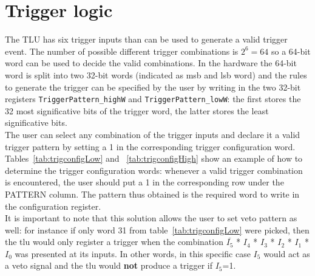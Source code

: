 \section{Trigger logic}\label{ch:triggerLogic}
The TLU has six trigger inputs than can be used to generate a valid trigger event. The number of possible different trigger combinations is $2^6= 64$ so a 64-bit word can be used to decide the valid combinations. In the hardware the 64-bit word is split into two 32-bit words (indicated as \gls{msb} and \gls{lsb} word) and the rules to generate the trigger can be specified by the user by writing in the two 32-bit registers \verb|TriggerPattern_highW| and \verb|TriggerPattern_lowW|: the first stores the 32 most significative bits of the trigger word, the latter stores the least significative bits.\\
The user can select any combination of the trigger inputs and declare it a valid trigger pattern by setting a 1 in the corresponding trigger configuration word.
Tables~\ref{tab:trigconfigLow} and ~\ref{tab:trigconfigHigh} show an example of how to determine the trigger configuration words: whenever a valid trigger combination is encountered, the user should put a 1 in the corresponding row under the PATTERN column. The pattern thus obtained is the required word to write in the configuration register.\\
It is important to note that this solution allows the user to set veto pattern as well: for instance if only word 31 from table~\ref{tab:trigconfigLow} were picked, then the \gls{tlu} would only register a trigger when the combination $\overline{I_{5}}$ * $I_{4}$ * $I_{3}$ * $I_{2}$ * $I_{1}$ * $I_{0}$ was presented at its inputs. In other words, in this specific case $I_{5}$ would act as a veto signal and the \gls{tlu} would \textbf{not} produce a trigger if $I_{5}$=1.

